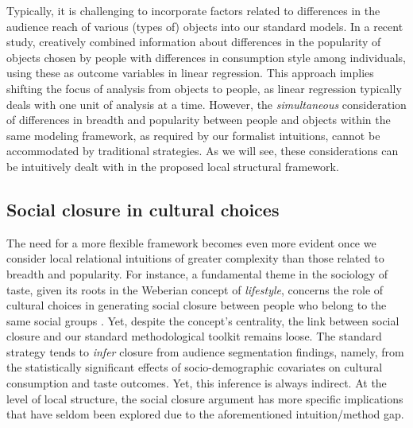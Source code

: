 \documentclass[preprint,12pt,authoryear]{elsarticle}
\begin{document}
Typically, it is challenging to incorporate factors related to differences in the audience reach of various (types of) objects into our standard models. In a recent study, \citet{puetz2021taste} creatively combined information about differences in the popularity of objects chosen by people with differences in consumption style among individuals, using these as outcome variables in linear regression. This approach implies shifting the focus of analysis from objects to people, as linear regression typically deals with one unit of analysis at a time. However, the \textit{simultaneous} consideration of differences in breadth and popularity between people and objects within the same modeling framework, as required by our formalist intuitions, cannot be accommodated by traditional strategies. As we will see, these considerations can be intuitively dealt with in the proposed local structural framework. 

\subsection{Social closure in cultural choices}
The need for a more flexible framework becomes even more evident once we consider local relational intuitions of greater complexity than those related to breadth and popularity. For instance, a fundamental theme in the sociology of taste, given its roots in the Weberian concept of \textit{lifestyle}, concerns the role of cultural choices in generating social closure between people who belong to the same social groups \citep{bourdieu1984distinction}. Yet, despite the concept's centrality, the link between social closure and our standard methodological toolkit remains loose. The standard strategy tends to \textit{infer} closure from audience segmentation findings, namely, from the statistically significant effects of socio-demographic covariates on cultural consumption and taste outcomes. Yet, this inference is always indirect. At the level of local structure, the social closure argument has more specific implications that have seldom been explored due to the aforementioned intuition/method gap. 
\end{document}
